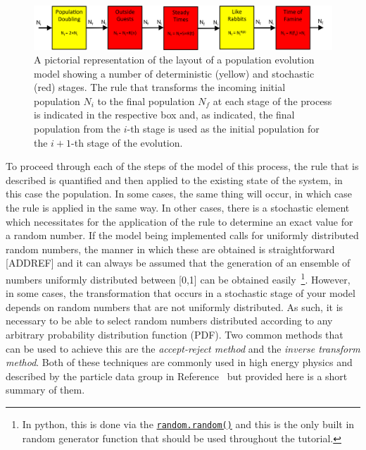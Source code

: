 \documentclass[UKenglish,texlive=2016]{\ATLASLATEXPATH atlasdoc}
\begin{document}
\begin{figure}
 \includegraphics[width=\linewidth]{figures/toymodelflow.png}
 \caption{A pictorial representation of the layout of a population evolution model showing a number of deterministic (yellow) and stochastic (red) stages.  The rule that transforms the incoming initial population $N_i$ to the final population $N_f$ at each stage of the process is indicated in the respective box and, as indicated, the final population from the $i$-th stage is used as the initial population for the $i+1$-th stage of the evolution. }
 \label{fig:mc_chain}
\end{figure}

To proceed through each of the steps of the model of this process, the rule that is described is quantified and then applied to the existing state of the system, in this case the population.  In some cases, the same thing will occur, in which case the rule is applied in the same way.  In other cases, there is a stochastic element which necessitates for the application of the rule to determine an exact value for a random number.  If the model being implemented calls for uniformly distributed random numbers, the manner in which these are obtained is straightforward [ADDREF] and it can always be assumed that the generation of an ensemble of numbers uniformly distributed between [0,1] can be obtained easily~\footnote{In python, this is done via the \href{https://docs.python.org/2/library/random.html}{\texttt{random.random()}} and this is the only built in random generator function that should be used throughout the tutorial.}.  However, in some cases, the transformation that occurs in a stochastic stage of your model depends on random numbers that are not uniformly distributed.  As such, it is necessary to be able to select random numbers distributed according to any arbitrary probability distribution function (PDF).  Two common methods that can be used to achieve this are the \textit{accept-reject method} and the \textit{inverse transform method}.  Both of these techniques are commonly used in high energy physics and described by the particle data group in Reference~\cite{pdg_mctechniques} but provided here is a short summary of them.
\end{document}

